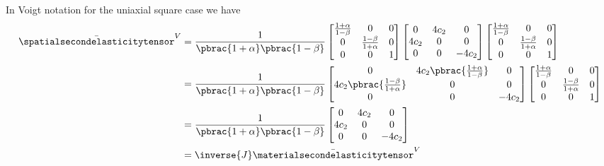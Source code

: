 In Voigt notation for the uniaxial square case we have
\begin{equation}
  \begin{split}
    \bar{\spatialsecondelasticitytensor}^{V}&=\dfrac{1}{\pbrac{1+\alpha}\pbrac{1-\beta}}\begin{bmatrix}
      \frac{1+\alpha}{1-\beta} & 0 & 0 \\
      0 & \frac{1-\beta}{1+\alpha} & 0 \\
      0 & 0 & 1
    \end{bmatrix}\begin{bmatrix}
      0 & 4c_{2} & 0 \\
      4c_{2} & 0 & 0 \\
      0 & 0 & -4c_{2}
    \end{bmatrix}\begin{bmatrix}
      \frac{1+\alpha}{1-\beta} & 0 & 0 \\
      0 & \frac{1-\beta}{1+\alpha} & 0 \\
      0 & 0 & 1
    \end{bmatrix}\\
    &=\dfrac{1}{\pbrac{1+\alpha}\pbrac{1-\beta}}\begin{bmatrix}
      0 & 4c_{2}\pbrac{\frac{1+\alpha}{1-\beta}} & 0 \\
      4c_{2}\pbrac{\frac{1-\beta}{1+\alpha}} & 0 & 0 \\
      0 & 0 & -4c_{2}
    \end{bmatrix}\begin{bmatrix}
      \frac{1+\alpha}{1-\beta} & 0 & 0 \\
      0 & \frac{1-\beta}{1+\alpha} & 0 \\
      0 & 0 & 1
    \end{bmatrix}\\
    &=\dfrac{1}{\pbrac{1+\alpha}\pbrac{1-\beta}}\begin{bmatrix}
      0 & 4c_{2} & 0 \\
      4c_{2} & 0 & 0 \\
      0 & 0 & -4c_{2}
    \end{bmatrix}\\
    &=\inverse{J}\bar{\materialsecondelasticitytensor}^{V}
  \end{split}
\end{equation}

